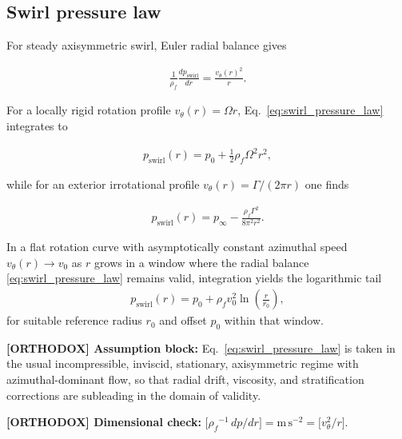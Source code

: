 \documentclass[11pt]{article}
\theoremstyle{definition}
\theoremstyle{plain}
\theoremstyle{remark}
\newcommand{\rhoF}{{\rho_{\!f}}}
\begin{document}
    \subsection{Swirl pressure law}
        \label{subsec:swirl_pressure_law}

        For steady axisymmetric swirl, Euler radial balance gives

        \begin{align}
            \frac{1}{\rhoF}\frac{dp_{\mathrm{swirl}}}{dr} = \frac{v_\theta(r)^2}{r}.
            \label{eq:swirl_pressure_law}
        \end{align}

        For a locally rigid rotation profile $v_\theta(r)=\Omega r$, Eq.~\eqref{eq:swirl_pressure_law} integrates to

        \begin{align}
            p_{\mathrm{swirl}}(r) = p_0 + \frac{1}{2}\rhoF \Omega^2 r^2,
            \label{eq:swirl_pressure_rigid}
        \end{align}

        while for an exterior irrotational profile $v_\theta(r)=\Gamma/(2\pi r)$ one finds

        \begin{align}
            p_{\mathrm{swirl}}(r) = p_\infty - \frac{\rhoF\Gamma^2}{8\pi^2 r^2}.
            \label{eq:swirl_pressure_irrotational}
        \end{align}

        In a flat rotation curve with asymptotically constant azimuthal speed $v_\theta(r)\to v_0$ as $r$ grows in a window where the radial balance \eqref{eq:swirl_pressure_law} remains valid, integration yields the logarithmic tail
        \begin{align}
            p_{\mathrm{swirl}}(r)
            =
            p_0 + \rhoF v_0^2 \ln\!\left(\frac{r}{r_0}\right),
            \label{eq:swirl_pressure_flat_tail}
        \end{align}
        for suitable reference radius $r_0$ and offset $p_0$ within that window.

        \textbf{[ORTHODOX] Assumption block:} Eq.~\eqref{eq:swirl_pressure_law} is taken in the usual incompressible, inviscid, stationary, axisymmetric regime with azimuthal-dominant flow, so that radial drift, viscosity, and stratification corrections are subleading in the domain of validity.

        \textbf{[ORTHODOX] Dimensional check:}
        $\bigl[\rhoF^{-1}\,dp/dr\bigr]=\mathrm{m\,s^{-2}}=\bigl[v_\theta^2/r\bigr]$.
\end{document}
